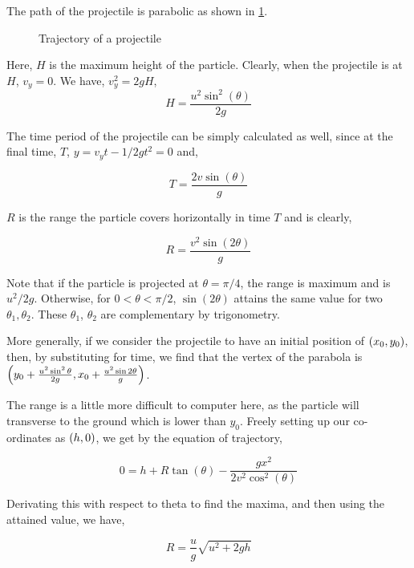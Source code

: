 The path of the projectile is parabolic as shown in \cref{fig: projectile}.

\begin{figure}[H]
    \centering
    \caption{Trajectory of a projectile}
    \label{fig: projectile}
\end{figure}

Here, \(H\) is the maximum height of the particle. Clearly,
when the projectile is at \(H\), \(v_y = 0\). We have, 
\(v_y^2 = 2gH\),
\begin{equation}
    \boxed{H = \frac{u^2\sin^2(\theta)}{2g}}
\end{equation}

The time period of the projectile can be simply calculated as well,
since at the final time, \(T\), \(y = v_yt - 1/2gt^2 = 0\) and,

\begin{equation}
    \boxed{T = \frac{2v\sin(\theta)}{g}}
\end{equation}

\(R\) is the range the particle covers horizontally in time \(T\) and is
clearly,

\begin{equation}
    \boxed{R = \frac{v^2\sin(2\theta)}{g}}
\end{equation}

Note that if the particle is projected at \(\theta = \pi/4\), 
the range is maximum and is \(u^2/2g\). Otherwise,
for \(0 < \theta < \pi/2\), \(\sin(2\theta)\) attains the same 
value for two \(\theta_1, \theta_2\). These \(\theta_1\), \(\theta_2\) are complementary
by trigonometry.

More generally, if we consider the projectile to have an initial position of 
\(\qty(x_0, y_0)\), then, by substituting for time, we find that the 
vertex of the parabola is \(\qty(y_0 + \frac{u^2\sin^2\theta}{2g}, x_0 + \frac{u^2\sin2\theta}{g})\).

The range is a little more difficult to computer here, as the particle will transverse to 
the ground which is lower than \(y_0\). Freely setting up our co-ordinates 
as \(\qty(h, 0)\), we get by the equation of trajectory,

\[
    0 = h + R\tan(\theta) - \frac{gx^2}{2v^2\cos^2(\theta)}
\]

Derivating this with respect to theta to find the maxima, and then using the attained
value, we have, 

\begin{equation}
    R = \frac{u}{g}\sqrt{u^2 + 2gh}
\end{equation}


